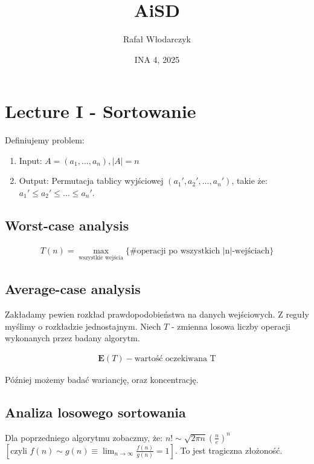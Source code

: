 \documentclass{article}
\title{AiSD}
\author{Rafał Włodarczyk}
\date{INA 4, 2025}
\begin{document}
\maketitle

\tableofcontents

\section{Lecture I - Sortowanie}

Definiujemy problem:

\begin{enumerate}
    \item Input: $A=(a_1,\dots,a_n), |A|=n$
    \item Output: Permutacja tablicy wyjściowej $(a_1',a_2',\dots,a_n')$, takie że: $a_1'\leq a_2' \leq \dots \leq a_n'$.
\end{enumerate}

\subsection{Worst-case analysis}

\begin{align}
    T(n) = \max_{\text{wszystkie wejścia}}\{\text{\#operacji po wszystkich |n|-wejściach}\}
\end{align}

\subsection{Average-case analysis}

Zakładamy pewien rozkład prawdopodobieństwa na danych wejściowych. Z reguły myślimy o rozkładzie jednostajnym. Niech $T$ - zmienna losowa liczby operacji wykonanych przez badany algorytm.

\begin{align}
    \mathbf{E}(T) - \text{wartość oczekiwana T}
\end{align}

\noindent
Później możemy badać wariancję, oraz koncentrację.

\subsection{Analiza losowego sortowania}

Dla poprzedniego algorytmu zobaczmy, że: $n! \sim \sqrt{2\pi n} \left(\frac{n}{e}\right)^n$ $\left[\text{czyli } f(n)\sim g(n) \equiv \lim_{n\rightarrow \infty} \frac{f(n)}{g(n)} = 1 \right]$. To jest tragiczna złożoność.
\end{document}
